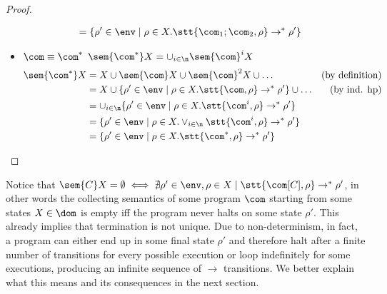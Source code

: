 \begin{proof}
\begin{itemize}
\begin{align*}
      & = \{\rho' \in\env \mid \rho \in X . \stt{\com_1;\com_2, \rho} \to^* \rho'\}
    \end{align*}
  \item \(\com \equiv \com^*\) \newline
    \(\sem{\com^*}X = \cup_{i\in\n}\sem{\com}^i X\)
    \begin{align*}
      \sem{\com^*}X & = X \cup \sem{\com}X \cup \sem{\com}^2X \cup \dots & \text{(by definition)}\\
      & = X \cup \{\rho' \in\env \mid \rho \in X . \stt{\com,\rho} \to^* \rho'\} \cup %
      \dots & \text{(by ind. hp)}\\
      & = \cup_{i\in\n} \{\rho' \in\env \mid \rho \in X . \stt{\com^i, \rho} \to^*  \rho'\} \\
      & = \{\rho' \in\env \mid \rho \in X . \vee_{i\in\n} \stt{\com^i, \rho} \to^* \rho'\} \\
      & = \{\rho' \in\env \mid \rho \in X . \stt{\com^*, \rho} \to^* \rho'\}
    \end{align*} \qedhere
  \end{itemize}
\end{proof}

Notice that
\(\sem{C}X = \emptyset \iff \nexists \rho'\in\env, \rho \in X \mid
\stt{\com[C],\rho} \to^* \rho'\), in other words the collecting
semantics of some program \(\com\) starting from some states
\(X\in\dom\) is empty iff the program never halts on some state
\(\rho'\). This already implies that termination is not unique. Due to
non-determinism, in fact, a program can either end up in some final
state \(\rho'\) and therefore halt after a finite number of
transitions for every possible execution or loop indefinitely for some
executions, producing an infinite sequence of \(\to\) transitions. We
better explain what this means and its consequences in the next
section.
